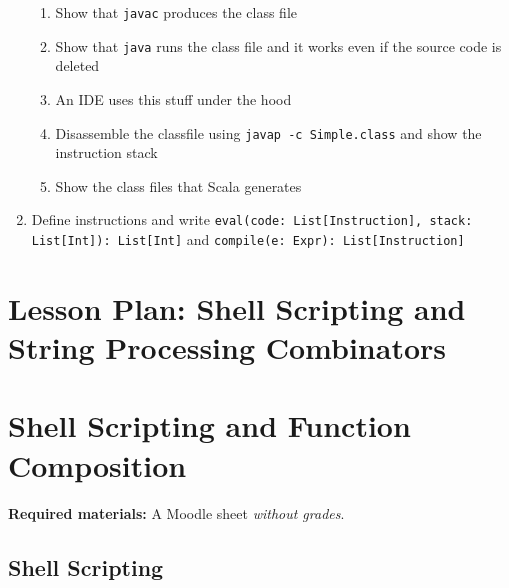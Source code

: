 \documentclass[9pt]{extbook}
\begin{document}
\begin{enumerate}
\begin{enumerate}
    \item Show that \texttt{javac} produces the class file

    \item Show that \texttt{java} runs the class file and it works even if the source code is deleted

    \item An IDE uses this stuff under the hood

    \item Disassemble the classfile using \texttt{javap -c Simple.class} and show the instruction stack

    \item Show the class files that Scala generates

  \end{enumerate}

  \item Define instructions and write
  \lstinline|eval(code: List[Instruction], stack: List[Int]): List[Int]|
  and \lstinline|compile(e: Expr): List[Instruction]|
  
\end{enumerate}

\chapter{Lesson Plan: Shell Scripting and String Processing Combinators}

\chapter{Shell Scripting and Function Composition}

\textbf{Required materials:} A Moodle sheet \emph{without grades}.

\section{Shell Scripting}
\end{document}
